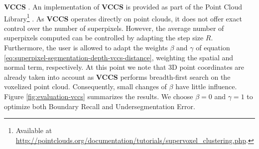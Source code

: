 \textbf{VCCS} \cite{PaponAbramovSchoelerWoergoetter:2013}. An implementation of \textbf{VCCS} is provided as part of the Point Cloud Library\footnote{Available at \url{http://pointclouds.org/documentation/tutorials/supervoxel_clustering.php}.} \cite{RusuCousins:2011}. As \textbf{VCCS} operates directly on point clouds, it does not offer exact control over the number of superpixels. However, the average number of superpixels computed can be controlled by adapting the step size $R$. Furthermore, the user is allowed to adapt the weights $\beta$ and $\gamma$ of equation \eqref{eq:superpixel-segmentation-depth-vccs-distance}, weighting the spatial and normal term, respectively. At this point we note that 3D point coordinates are already taken into account as \textbf{VCCS} performs breadth-first search on the voxelized point cloud. Consequently, small changes of $\beta$ have little influence. Figure \ref{fig:evaluation-vccs} summarizes the results. We choose $\beta = 0$ and $\gamma = 1$ to optimize both Boundary Recall and Undersegmentation Error.
